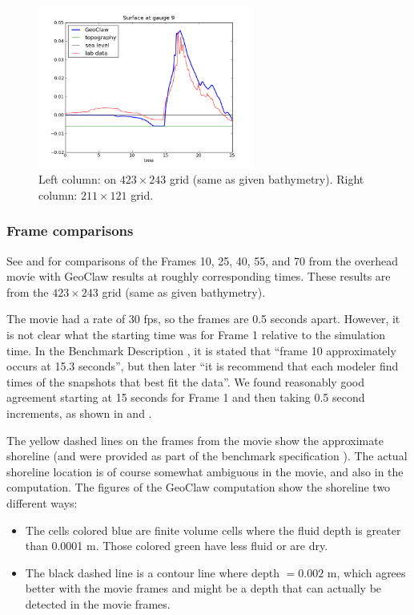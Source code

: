 \begin{figure}[ht]
\hfil\includegraphics[width=2.8in]{bp7/figs211/gauge0009fig300.png}\hfil
\caption{\label{fig:bp7gauges} 
Left column: on $423\times 243$ grid (same as given bathymetry).
Right column: $211\times 121$ grid.
  }
\end{figure}



\subsubsection{Frame comparisons}

See  and  for comparisons of the Frames 10,
25, 40, 55, and 70 from the overhead movie with GeoClaw results at roughly
corresponding times.  These results are from the $423\times 243$ grid (same
as given bathymetry).

The movie had a rate of 30 fps, so the frames are 0.5 seconds apart. However,
it is not clear what the starting time was for Frame 1 relative to the
simulation time.   In the Benchmark Description \cite{bp-description}, it is
stated that ``frame 10 approximately occurs at 15.3 seconds'', but then later
``it is recommend that each modeler find times of the snapshots that best fit
the data''.   We found reasonably good agreement starting at 15 seconds for
Frame 1 and then taking 0.5 second increments, as shown in 
and .

The yellow dashed lines on the frames from the movie show the approximate
shoreline (and were provided as part of the benchmark specification
\cite{bp-description}).  The actual shoreline location is of course somewhat
ambiguous in the movie, and also in the computation.  The figures of the
GeoClaw computation show the shoreline two different ways:
\begin{itemize}
\item The cells colored blue are finite volume cells where the fluid depth is
greater than 0.0001 m. Those colored green have less fluid or are dry.
\item The black dashed line is a contour line where depth $= 0.002$ m, which
agrees better with the movie frames and might be a depth that can actually be
detected in the movie frames.
\end{itemize} 

